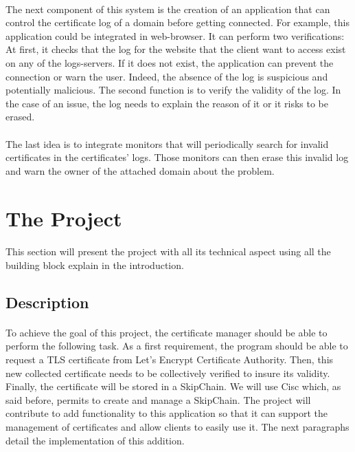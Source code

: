 \documentclass[11pt, a4paper, twoside, openright]{article}
\begin{document}
\paragraph{} The next component of this system is the creation of an application that can control the certificate log of a domain before getting connected. For example, this application could be integrated in web-browser. It can perform two verifications: At first, it checks that the log for the website that the client want to access exist on any of the logs-servers. If it does not exist, the application can prevent the connection or warn the user. Indeed, the absence of the log is suspicious and potentially malicious. The second function is to verify the validity of the log. In the case of an issue, the log needs to explain the reason of it or it risks to be erased.
\paragraph{} The last idea is to integrate monitors that will periodically search for invalid certificates in the certificates' logs. Those monitors can then erase this invalid log and warn the owner of the attached domain about the problem.   

\section{The Project}
\paragraph{} This section will present the project with all its technical aspect using all the building block explain in the introduction.
\subsection{Description}
\paragraph{} To achieve the goal of this project, the certificate manager should be able to perform the following task. As a first requirement, the program should be able to request a TLS certificate from Let's Encrypt Certificate Authority. Then, this new collected certificate needs to be collectively verified to insure its validity. Finally, the certificate will be stored in a SkipChain.
We will use Cisc which, as said before, permits to create and manage a SkipChain. 
The project will contribute to add functionality to this application so that it can support the management of certificates and allow clients to easily use it. The next paragraphs detail the implementation of this addition.
\end{document}
